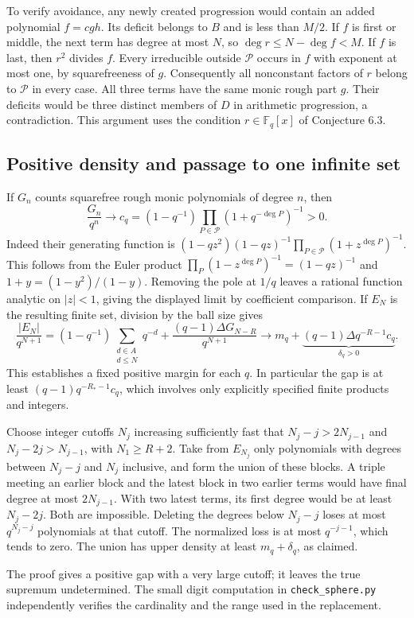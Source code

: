To verify avoidance, any newly created progression would contain an added
polynomial $f=cgh$. Its deficit belongs to $B$ and is less than $M/2$.
If $f$ is first or middle, the next term has degree at most $N$, so
$\deg r\le N-\deg f<M$. If $f$ is last, then $r^2$ divides $f$.
Every irreducible outside $\mathcal P$ occurs in $f$ with exponent at
most one, by squarefreeness of $g$. Consequently all nonconstant factors
of $r$ belong to $\mathcal P$ in every case. All three terms have the
same monic rough part $g$. Their deficits would be three distinct members
of $D$ in arithmetic progression, a contradiction. This argument uses the
condition $r\in\mathbb F_q[x]$ of Conjecture 6.3.

\subsection*{Positive density and passage to one infinite set}
If $G_n$ counts squarefree rough monic polynomials of degree $n$, then
\[
 \frac{G_n}{q^n}\longrightarrow
 c_q=(1-q^{-1})\prod_{P\in\mathcal P}(1+q^{-\deg P})^{-1}>0 .
\]
Indeed their generating function is
$(1-qz^2)(1-qz)^{-1}\prod_{P\in\mathcal P}(1+z^{\deg P})^{-1}$.
This follows from the Euler product $\prod_P(1-z^{\deg P})^{-1}=(1-qz)^{-1}$
and $1+y=(1-y^2)/(1-y)$. Removing the pole at $1/q$ leaves a rational
function analytic on $|z|<1$, giving the displayed limit by coefficient
comparison. If $E_N$ is the resulting finite set, division by the ball size gives
\[
 \frac{|E_N|}{q^{N+1}}
 =(1-q^{-1})\sum_{\substack{d\in A\\d\le N}} q^{-d}
     + \frac{(q-1)\Delta G_{N-R}}{q^{N+1}}
 \longrightarrow m_q+\underbrace{(q-1)\Delta q^{-R-1}c_q}_{\displaystyle\delta_q>0}.
\]
This establishes a fixed positive margin for each $q$. In particular the gap is at least $(q-1)q^{-R_*-1}c_q$, which involves only explicitly specified finite products and integers.

Choose integer cutoffs $N_j$ increasing sufficiently fast that
$N_j-j>2N_{j-1}$ and $N_j-2j>N_{j-1}$, with $N_1\ge R+2$.
Take from $E_{N_j}$ only polynomials with degrees between $N_j-j$ and
$N_j$ inclusive, and form the union of these blocks.
A triple meeting an earlier block and the latest block in two earlier
terms would have final degree at most $2N_{j-1}$. With two latest terms,
its first degree would be at least $N_j-2j$. Both are impossible.
Deleting the degrees below $N_j-j$ loses at most $q^{N_j-j}$ polynomials at
that cutoff. The normalized loss is at most $q^{-j-1}$, which tends to zero.
The union has upper density at least $m_q+\delta_q$, as claimed.

The proof gives a positive gap with a very large cutoff; it leaves the true
supremum undetermined. The small digit computation in \texttt{check\_sphere.py}
independently verifies the cardinality and the range used in the replacement.
